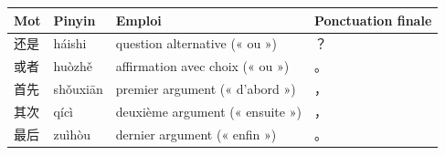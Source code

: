 \documentclass[11pt]{article}
\begin{document}
\begin{center}
\begin{tabularx}{\linewidth}{|X|X|X|X|}\hline
\rowcolor{popblueL} Mot & Pinyin & Emploi & Ponctuation finale \\ \hline
还是 & háishi & question alternative (« ou ») & ？ \\ \hline
或者 & huòzhě & affirmation avec choix (« ou ») & 。 \\ \hline
首先 & shǒuxiān & premier argument (« d'abord ») & ， \\ \hline
其次 & qícì & deuxième argument (« ensuite ») & ， \\ \hline
最后 & zuìhòu & dernier argument (« enfin ») & 。 \\ \hline
\end{tabularx}
\end{center}
\end{document}
